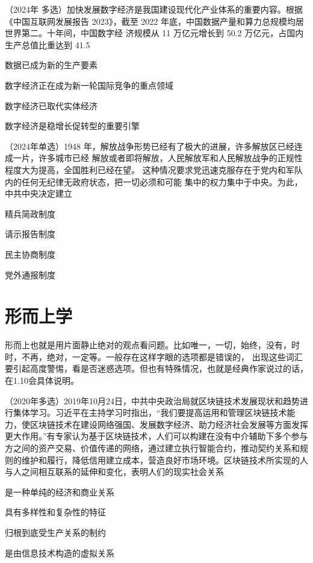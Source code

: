 \documentclass[lang=cn,newtx,10pt,scheme=chinese,pad,twocol]{zznote}
\begin{document}
\begin{example}
	（2024年 多选）加快发展数字经济是我国建设现代化产业体系的重要内容。根据《中国互联网发展报告 2023》，截至 2022 年底，中国数据产量和算力总规模均居世界第二。十年间，中国数字经 济规模从 11 万亿元增长到 50.2 万亿元，占国内生产总值比重达到 41.5%
	\begin{choice}
		\item 数据已成为新的生产要素
		\item 数字经济正在成为新一轮国际竞争的重点领域
		\item 数字经济已取代实体经济
		\item 数字经济是稳增长促转型的重要引擎
	\end{choice}
\end{example}




\begin{example}
	（2024年单选）1948 年，解放战争形势已经有了极大的进展，许多解放区已经连成一片，许多城市已经 解放或者即将解放，人民解放军和人民解放战争的正规性程度大为提高，全国胜利已经在望。 这种情况要求党迅速克服存在于党内和军队内的任何无纪律无政府状态，把一切必须和可能 集中的权力集中于中央。为此，中共中央决定建立
	\begin{choice}
		\item 精兵简政制度
		\item 请示报告制度
		\item 民主协商制度
		\item 党外通报制度
	\end{choice}
\end{example}

\section{形而上学}
\begin{definition}
	形而上也就是用片面静止绝对的观点看问题。比如唯一，一切，始终，没有，时时，不再，绝对，一定等。一般存在这样字眼的选项都是错误的，
	出现这些词汇要引起高度警惕，看是否迷惑选项。但也有特殊情况，也就是经典作家说过的话，在1.10会具体说明。
\end{definition}


\begin{example} （2020年多选）2019年10月24日，中共中央政治局就区块链技术发展现状和趋势进行集体学习。习近平在主持学习时指出，“我们要提高运用和管理区块链技术能力，使区块链技术在建设网络强国、发展数字经济、助力经济社会发展等方面发挥更大作用。”有专家认为基于区块链技术，人们可以构建在没有中介辅助下多个参与方之间的资产交易、价值传递的网络，通过建立执行智能合约，推动契约关系和规则的维护和履行，降低信用建立成本，营造良好市场环境。区块链技术所实现的人与人之间相互联系的延伸和变化，表明人们的现实社会关系
	\begin{choice}
		\item 是一种单纯的经济和商业关系
		\item 具有多样性和复杂性的特征
		\item 归根到底受生产关系的制约
		\item 是由信息技术构造的虚拟关系
	\end{choice}
\end{example}
\end{document}
